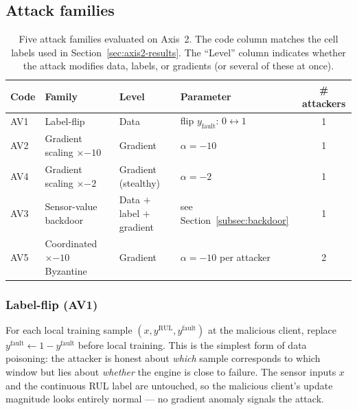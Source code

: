 \documentclass[a4paper,fleqn,doubleblind]{cas-sc}
\newcommand{\tblhead}{\rowcolor{tblHeadBg}}
\newcommand{\zebra}{\rowcolors{2}{tblAltBg}{white}}
\newcommand{\tblhead}{}
\newcommand{\zebra}{}
\begin{document}
\subsection{Attack families}
\label{subsec:attacks}

\begin{table}[pos=tbp]
\centering
\footnotesize
\setlength{\tabcolsep}{6pt}
\renewcommand{\arraystretch}{1.15}
\caption{Five attack families evaluated on Axis~2. The code column
matches the cell labels used in Section~\ref{sec:axis2-results}.
The ``Level'' column indicates whether the attack modifies data,
labels, or gradients (or several of these at once).}
\label{tab:attacks}
\zebra
\begin{tabular}{@{}l l l l c@{}}
\toprule
\tblhead
Code & Family & Level & Parameter & \# attackers \\
\midrule
AV1 & Label-flip                  & Data                        & flip $y_{\mathrm{fault}}$: $0 \leftrightarrow 1$ & 1 \\
AV2 & Gradient scaling $\times{-10}$ & Gradient                  & $\alpha = -10$                                   & 1 \\
AV4 & Gradient scaling $\times{-2}$  & Gradient (stealthy)        & $\alpha = -2$                                    & 1 \\
AV3 & Sensor-value backdoor       & Data $+$ label $+$ gradient & see Section~\ref{subsec:backdoor}                & 1 \\
AV5 & Coordinated $\times{-10}$ Byzantine & Gradient           & $\alpha = -10$ per attacker                      & 2 \\
\bottomrule
\end{tabular}
\end{table}

\subsubsection{Label-flip (AV1)}
\label{subsec:labelflip}

For each local training sample
$(x, y^{\mathrm{RUL}}, y^{\mathrm{fault}})$ at the malicious client,
replace $y^{\mathrm{fault}} \gets 1 - y^{\mathrm{fault}}$ before
local training. This is the simplest form of data poisoning: the
attacker is honest about \emph{which} sample corresponds to which
window but lies about \emph{whether} the engine is close to failure.
The sensor inputs $x$ and the continuous RUL label are untouched,
so the malicious client's update magnitude looks entirely normal ---
no gradient anomaly signals the attack.
\end{document}
